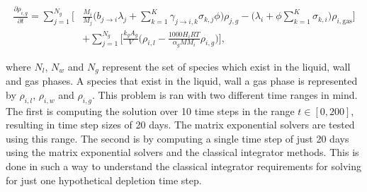 \begin{equation}
\begin{split}
    \frac{\partial \rho_{i,g}}{\partial t}
    =
    \sum_{j=1}^{N_{g}}\bigg[&\frac{M_{i}}{M_{j}}\bigg(b_{j\rightarrow i}\lambda_{j} + 
    \sum_{k=1}^{K}\gamma_{j\rightarrow i,k}\sigma_{k,j}\phi \bigg)\rho_{j, g}
    - \bigg(\lambda_{i} + \phi\sum_{k=1}^{K} \sigma_{k,i}\bigg)\rho_{i, \text{gas}} \bigg]\\ & + \sum_{j=1}^{N_{g}} \bigg[  \frac{k_{g}A_{g}}{V}\bigg(\rho_{i,l} - \frac{1000H_{i}RT}{\alpha_{g}MM_{i}}\rho_{i, g}\bigg) \bigg],
    \label{eq:MSRLumpDepletionSmallGasPhase}
\end{split}
\end{equation}

\noindent where $N_{l}$, $N_{w}$ and $N_{g}$ represent the set of species which exist in the liquid, wall and gas phases. A species that exist in the liquid, wall a gas phase is represented by $\rho_{i,l}$, $\rho_{i,w}$ and $\rho_{i,g}$.  This problem is ran with two different time ranges in mind. The first is computing the solution over 10 time steps in the range $t \in [0, 200]$, resulting in time step sizes of 20 days. The matrix exponential solvers are tested using this range. The second is by computing a single time step of just 20 days using the matrix exponential solvers and the classical integrator methods. This is done in such a way to understand the classical integrator requirements for solving for just one hypothetical depletion time step. 

